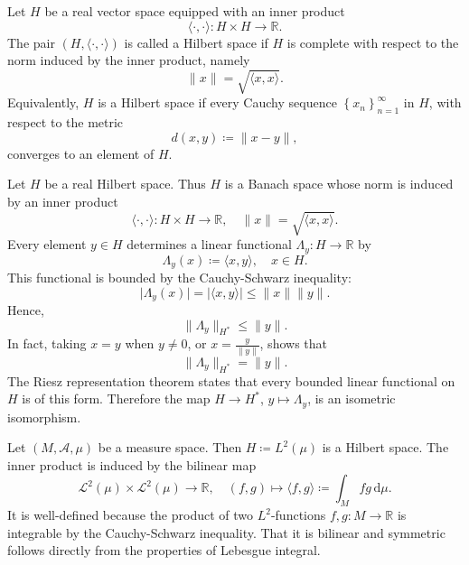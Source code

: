 \begin{definition}
    Let \(H\) be a real vector space equipped with an inner product 
    \[
        \langle \cdot, \cdot \rangle : H \times H \to \mathbb{R}. 
    \] 
    The pair \((H, \langle \cdot, \cdot \rangle )\) is called a Hilbert space if \(H\) is complete with respect to the norm induced by the inner product, namely 
    \[
        \lVert x \rVert = \sqrt{\langle x, x \rangle }.  
    \]  
    Equivalently, \(H\) is a Hilbert space if every Cauchy sequence \(\left\{ x_n \right\}_{n=1}^{\infty} \) in \(H\), with respect to the metric 
    \[
        d(x, y) \coloneqq \lVert x - y \rVert, 
    \]  
    converges to an element of \(H\). 
\end{definition}

\begin{eg}
    Let \(H\) be a real Hilbert space. Thus \(H\) is a Banach space whose norm is induced by an inner product
    \[
        \langle \cdot, \cdot \rangle: H \times H \to \mathbb{R}, \quad \lVert x \rVert = \sqrt{\langle x, x \rangle }.   
    \]  
    Every element \(y \in H\) determines a linear functional \(\Lambda _y : H \to \mathbb{R}\) by 
    \[
        \Lambda _y (x) \coloneqq \langle x, y \rangle, \quad x \in H. 
    \]  
    This functional is bounded by the Cauchy-Schwarz inequality: 
    \[
        \vert \Lambda _y (x) \vert = \vert \langle x, y \rangle  \vert \le \lVert x \rVert \lVert y \rVert.    
    \]
    Hence, 
    \[
        \lVert \Lambda _y \rVert_{H^*} \le \lVert y \rVert. 
    \]
    In fact, taking \(x = y\) when \(y \neq 0\), or \(x = \frac{y}{\lVert y \rVert }\), shows that 
    \[
        \lVert \Lambda _y \rVert_{H^*} = \lVert y \rVert.  
    \]
    The Riesz representation theorem states that every bounded linear functional on \(H\) is of this form. Therefore the map \(H \to H^*\), \(y \mapsto \Lambda _y\), is an isometric isomorphism.   
\end{eg}

\begin{eg}
    Let \((M, \mathcal{A}, \mu )\) be a measure space. Then \(H \coloneqq L^2 (\mu)\) is a Hilbert space. The inner product is induced by the bilinear map 
    \[
        \mathcal{L} ^2 (\mu ) \times \mathcal{L} ^2 (\mu ) \to \mathbb{R}, \quad (f, g) \mapsto \langle f, g \rangle \coloneqq \int _M fg \, \mathrm{d} \mu. 
    \]  
    It is well-defined because the product of two \(L^2\)-functions \(f, g: M \to \mathbb{R}\) is integrable by the Cauchy-Schwarz inequality. That it is bilinear and symmetric follows directly from the properties of Lebesgue integral.  
\end{eg}

